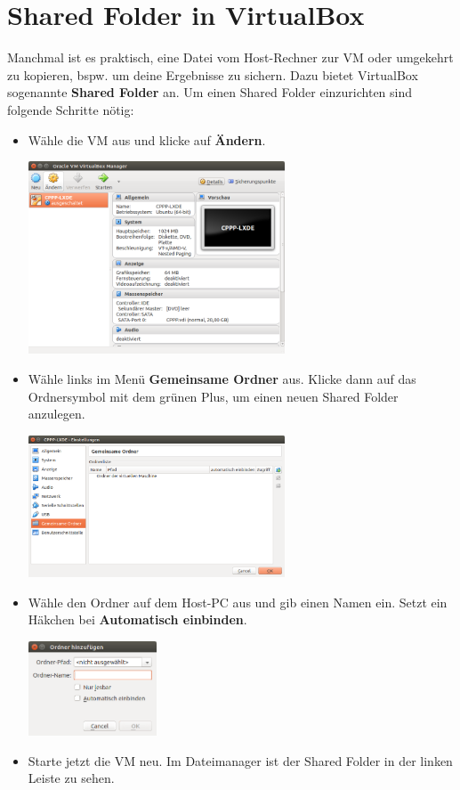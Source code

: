 \section{Shared Folder in VirtualBox}

Manchmal ist es praktisch, eine Datei vom Host-Rechner zur VM oder umgekehrt zu kopieren, bspw. um deine Ergebnisse zu sichern.
Dazu bietet VirtualBox sogenannte \textbf{Shared Folder} an.
Um einen Shared Folder einzurichten sind folgende Schritte nötig:

\begin{itemize}
\item Wähle die VM aus und klicke auf \textbf{Ändern}.
\begin{center}
	\includegraphics[width=0.6\textwidth]{07_cheatsheet/figures/sf1.png}
\end{center}
\item Wähle links im Menü \textbf{Gemeinsame Ordner} aus. Klicke dann auf das Ordnersymbol mit dem grünen Plus, um einen neuen Shared Folder anzulegen.
\begin{center}
	\includegraphics[width=0.6\textwidth]{07_cheatsheet/figures/sf2.png}
\end{center}
\item Wähle den Ordner auf dem Host-PC aus und gib einen Namen ein.
Setzt ein Häkchen bei \textbf{Automatisch einbinden}.
\begin{center}
	\includegraphics[width=0.3\textwidth]{07_cheatsheet/figures/sf3.png}
\end{center}
\item Starte jetzt die VM neu. Im Dateimanager ist der Shared Folder in der linken Leiste zu sehen.
\end{itemize}